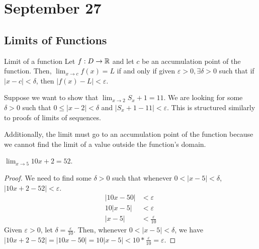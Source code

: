 \chapter{September 27}

\section{Limits of Functions}
\begin{definition}{Limit of a function}{}
    Let $f:D \to \mathbb{R}$ and let $c$ be an accumulation point of the function. Then, $\lim_{x \to c} f(x) = L$ if and only if given $\varepsilon > 0, \exists \delta > 0$ such that if $|x - c| < \delta$, then $|f(x) - L| < \varepsilon$.
\end{definition}
\begin{note}
    Suppose we want to show that $\lim_{x \to 2} S_x + 1 = 11$. We are looking for some $\delta > 0$ such that $0 \leq |x  - 2| < \delta$ and $|S_x + 1 - 11| < \varepsilon$. This is structured similarly to proofs of limits of sequences.

    Additionally, the limit must go to an accumulation point of the function because we cannot find the limit of a value outside the function's domain.
\end{note}

\begin{theorem}{}{}
    $\lim_{x \to 5} 10x + 2 = 52$.
\end{theorem}
\begin{proof}
    We need to find some $\delta > 0$ such that whenever $0 < |x - 5| < \delta$, $|10x + 2 - 52| < \varepsilon$.
    \begin{align*}
        |10x - 50| &< \varepsilon \\
        10|x - 5| &< \varepsilon \\
        |x - 5| &< \frac{\varepsilon}{10}
    \end{align*}
    Given $\varepsilon > 0$, let $\delta = \frac{\varepsilon}{10}$. Then, whenever $0 < |x - 5| < \delta$, we have $|10x + 2 - 52| = |10x - 50| = 10|x - 5| < 10 * \frac{\varepsilon}{10} = \varepsilon$.
\end{proof}

